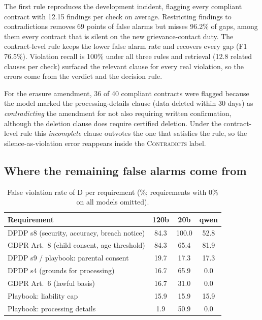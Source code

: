 \documentclass[conference]{IEEEtran}
\begin{document}
The first rule reproduces the development incident, flagging every compliant contract with 12.15 findings per check on average. Restricting findings to contradictions removes 69 points of false alarms but misses 96.2\% of gaps, among them every contract that is silent on the new grievance-contact duty. The contract-level rule keeps the lower false alarm rate and recovers every gap (F1 76.5\%). Violation recall is 100\% under all three rules and retrieval (12.8 related clauses per check) surfaced the relevant clause for every real violation, so the errors come from the verdict and the decision rule.

For the erasure amendment, 36 of 40 compliant contracts were flagged because the model marked the processing-details clause (data deleted within 30 days) as \emph{contradicting} the amendment for not also requiring written confirmation, although the deletion clause does require certified deletion. Under the contract-level rule this \emph{incomplete} clause outvotes the one that satisfies the rule, so the silence-as-violation error reappears inside the \textsc{Contradicts} label.

\subsection{Where the remaining false alarms come from}

\begin{table}[t]
\centering
\caption{False violation rate of D per requirement (\%; requirements with 0\% on all models omitted).}
\label{tab:perreq}
\begin{tabular}{lccc}
\toprule
Requirement & 120b & 20b & qwen \\
\midrule
DPDP s8 (security, accuracy, breach notice) & 84.3 & 100.0 & 52.8 \\
GDPR Art.\ 8 (child consent, age threshold) & 84.3 & 65.4 & 81.9 \\
DPDP s9 / playbook: parental consent & 19.7 & 17.3 & 17.3 \\
DPDP s4 (grounds for processing) & 16.7 & 65.9 & 0.0 \\
GDPR Art.\ 6 (lawful basis) & 16.7 & 31.0 & 0.0 \\
Playbook: liability cap & 15.9 & 15.9 & 15.9 \\
Playbook: processing details & 1.9 & 50.9 & 0.0 \\
\bottomrule
\end{tabular}
\end{table}
\end{document}
